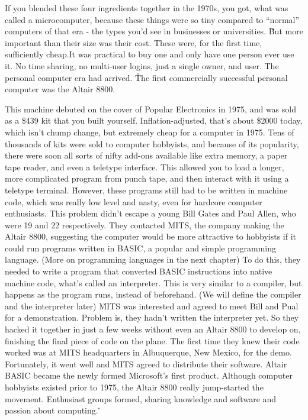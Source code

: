 If you blended these four ingredients together in the 1970s, you got, what was called a microcomputer, because these
things were so tiny compared to ``normal'' computers of that era - the types you'd see in businesses or universities.
\v

But more important than their size was their cost. These were, for the first time, sufficiently cheap.It was
practical to buy one and only have one person ever use it. No time sharing, no multi-user logins, just a single
owner, and user. The personal computer era had arrived.  \v

The first commercially successful personal computer was the Altair 8800.


This machine debuted on the cover of Popular Electronics in 1975, and was sold as a \$439 kit that you built yourself.
Inflation-adjusted, that's about \$2000 today, which isn't chump change, but extremely cheap for a computer in
1975. Tens of thousands of kits were sold to computer hobbyists, and because of its popularity, there were soon all
sorts of nifty add-ons available like extra memory, a paper tape reader, and even a teletype interface. This allowed
you to load a longer, more complicated program from punch tape, and then interact with it using a teletype terminal. \v

However, these programs still had to be written in machine code, which was really low level and nasty, even for
hardcore computer enthusiasts. This problem didn't escape a young Bill Gates and Paul Allen, who were 19 and 22
respectively. They contacted MITS, the company making the Altair 8800, suggesting the computer would be more
attractive to hobbyists if it could run programs written in BASIC, a popular and simple programming language. (More
on programming languages in the next chapter) To do this, they needed to write a program that converted BASIC
instructions into native machine code, what's called an interpreter. This is very similar to a compiler, but happens
as the program runs, instead of beforehand. (We will define the compiler and the interpreter later) \v

MITS was interested and agreed to meet Bill and Pual for a demonstration. Problem is, they hadn't written the
interpreter yet. So they hacked it together in just a few weeks without even an Altair 8800 to develop on, finishing
the final piece of code on the plane. The first time they knew their code worked was at MITS headquarters in
Albuquerque, New Mexico, for the demo.
Fortunately, it went well and MITS agreed to distribute their software. Altair BASIC became the newly formed
Microsoft's first product. Although computer hobbyists existed prior to 1975, the Altair 8800 really jump-started the
movement. Enthusiast groups formed, sharing knowledge and software and passion about computing. \v

